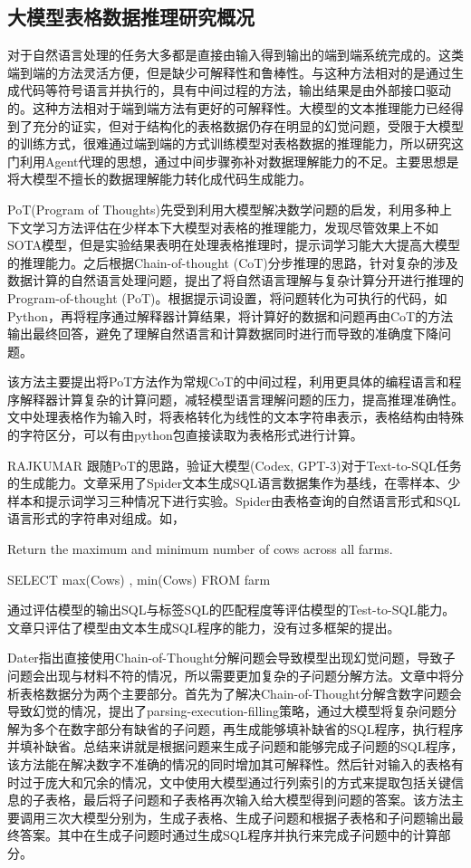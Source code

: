 \subsection{大模型表格数据推理研究概况}
对于自然语言处理的任务大多都是直接由输入得到输出的端到端系统完成的\cite{devlin2019bert,raffel2020exploring}。这类端到端的方法灵活方便，但是缺少可解释性和鲁棒性。与这种方法相对的是通过生成代码等符号语言并执行的，具有中间过程的方法，输出结果是由外部接口驱动的。这种方法相对于端到端方法有更好的可解释性。大模型的文本推理能力已经得到了充分的证实\cite{floridi2020gpt,liu2024gpt}，但对于结构化的表格数据仍存在明显的幻觉问题，受限于大模型的训练方式，很难通过端到端的方式训练模型对表格数据的推理能力，所以研究这门利用Agent代理的思想，通过中间步骤弥补对数据理解能力的不足。主要思想是将大模型不擅长的数据理解能力转化成代码生成能力。

PoT(Program of Thoughts)\cite{chen2023large,chenprogram}先受到利用大模型解决数学问题的启发，利用多种上下文学习方法评估在少样本下大模型对表格的推理能力，发现尽管效果上不如SOTA模型，但是实验结果表明在处理表格推理时，提示词学习能大大提高大模型的推理能力。之后根据Chain-of-thought (CoT)\cite{wei2022chain}分步推理的思路，针对复杂的涉及数据计算的自然语言处理问题，提出了将自然语言理解与复杂计算分开进行推理的Program-of-thought (PoT)。根据提示词设置，将问题转化为可执行的代码，如Python，再将程序通过解释器计算结果，将计算好的数据和问题再由CoT的方法输出最终回答，避免了理解自然语言和计算数据同时进行而导致的准确度下降问题。

该方法主要提出将PoT方法作为常规CoT的中间过程，利用更具体的编程语言和程序解释器计算复杂的计算问题，减轻模型语言理解问题的压力，提高推理准确性。文中处理表格作为输入时，将表格转化为线性的文本字符串表示，表格结构由特殊的字符区分，可以有由python包直接读取为表格形式进行计算。

RAJKUMAR \cite{rajkumar2022evaluating}跟随PoT\cite{chenprogram}的思路，验证大模型(Codex, GPT-3)对于Text-to-SQL任务的生成能力。文章采用了Spider文本生成SQL语言数据集作为基线，在零样本、少样本和提示词学习三种情况下进行实验。Spider由表格查询的自然语言形式和SQL语言形式的字符串对组成。如，

Return the maximum and minimum number of cows across all farms.

	SELECT max(Cows) , min(Cows) FROM farm
    
通过评估模型的输出SQL与标签SQL的匹配程度等评估模型的Test-to-SQL能力。文章只评估了模型由文本生成SQL程序的能力，没有过多框架的提出。

Dater\cite{ye2023large}指出直接使用Chain-of-Thought分解问题会导致模型出现幻觉问题，导致子问题会出现与材料不符的情况，所以需要更加复杂的子问题分解方法。文章中将分析表格数据分为两个主要部分。首先为了解决Chain-of-Thought分解含数字问题会导致幻觉的情况，提出了parsing-execution-filling策略，通过大模型将复杂问题分解为多个在数字部分有缺省的子问题，再生成能够填补缺省的SQL程序，执行程序并填补缺省。总结来讲就是根据问题来生成子问题和能够完成子问题的SQL程序，该方法能在解决数字不准确的情况的同时增加其可解释性。然后针对输入的表格有时过于庞大和冗余的情况，文中使用大模型通过行列索引的方式来提取包括关键信息的子表格，最后将子问题和子表格再次输入给大模型得到问题的答案。该方法主要调用三次大模型分别为，生成子表格、生成子问题和根据子表格和子问题输出最终答案。其中在生成子问题时通过生成SQL程序并执行来完成子问题中的计算部分。

